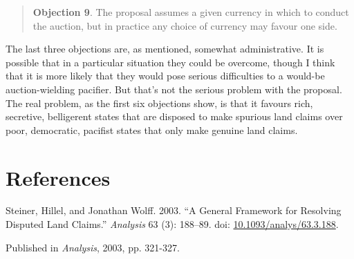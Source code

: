 \documentclass[
  11pt,
  letterpaper,
  DIV=11,
  numbers=noendperiod,
  twoside]{scrartcl}
\newlength{\cslhangindent}
\newenvironment{CSLReferences}[2] %
 {\begin{list}{}{%
  \setlength{\itemindent}{0pt}
  \setlength{\leftmargin}{0pt}
  \setlength{\parsep}{0pt}
  \ifodd #1
   \setlength{\leftmargin}{\cslhangindent}
   \setlength{\itemindent}{-1\cslhangindent}
  \fi
  \setlength{\itemsep}{#2\baselineskip}}}
 {\end{list}}
\begin{document}
\begin{quote}
\textbf{Objection 9}. The proposal assumes a given currency in which to
conduct the auction, but in practice any choice of currency may favour
one side.
\end{quote}

The last three objections are, as mentioned, somewhat administrative. It
is possible that in a particular situation they could be overcome,
though I think that it is more likely that they would pose serious
difficulties to a would-be auction-wielding pacifier. But that's not the
serious problem with the proposal. The real problem, as the first six
objections show, is that it favours rich, secretive, belligerent states
that are disposed to make spurious land claims over poor, democratic,
pacifist states that only make genuine land claims.

\section*{References}\label{references}

\label{refs}
\begin{CSLReferences}{1}{0}
Steiner, Hillel, and Jonathan Wolff. 2003. {``A General Framework for
Resolving Disputed Land Claims.''} \emph{Analysis} 63 (3): 188--89. doi:
\href{https://doi.org/10.1093/analys/63.3.188}{10.1093/analys/63.3.188}.

\end{CSLReferences}



\noindent Published in\emph{
Analysis}, 2003, pp. 321-327.
\end{document}
